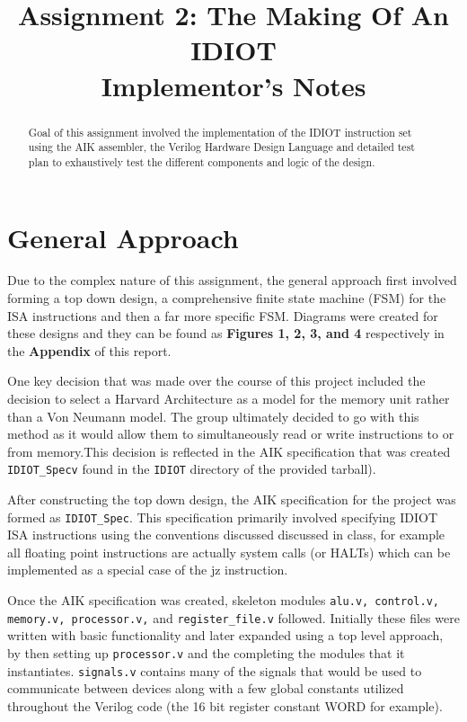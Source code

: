 \documentclass[conference]{IEEEtran}
\begin{document}
\title{Assignment 2: The Making Of An IDIOT\\Implementor's Notes}
\author{
        }

\maketitle

\begin{abstract}
Goal of this assignment involved the implementation of the IDIOT instruction set
using the AIK assembler, the Verilog Hardware Design Language and detailed test
plan to exhaustively test the different components and logic of the design. 
\end{abstract}

\section{General Approach}
Due to the complex nature of this assignment, the general approach 
first involved forming a top down design, a comprehensive finite
state machine (FSM) for the ISA instructions and then a far more specific
FSM. Diagrams were created for these designs and they can be 
found as \textbf{Figures 1, 2, 3, and 4} respectively in the \textbf{Appendix} 
of this report. 

One key decision that was made over the course of this project included 
the decision to select a Harvard Architecture as a model for the memory unit
rather than a Von Neumann model. The group ultimately decided to go 
with this method as it would allow them to simultaneously read or write
instructions to or from memory.This decision is reflected in the AIK 
specification that was created \texttt{IDIOT\_Specv} found in the \texttt{IDIOT}
directory of the provided tarball).

After constructing the top down design, the AIK specification
for the project was formed as \texttt{IDIOT\_Spec}. This specification primarily involved specifying IDIOT ISA 
instructions using the conventions discussed discussed in class, for example all
floating point instructions are actually system calls (or HALTs) which can be implemented as a special case of the jz instruction. 

Once the AIK specification was created, skeleton modules \texttt{alu.v, control.v,
memory.v, processor.v,} and \texttt{register\_file.v} followed. Initially these files were 
written with basic functionality and later expanded using a top level approach,
by then setting up \texttt{processor.v} and the completing the modules that it
instantiates. \texttt{signals.v} contains many of the signals that would be used  to communicate 
between devices along with a few global constants utilized throughout the 
Verilog code (the 16 bit register constant WORD for example).
\end{document}
